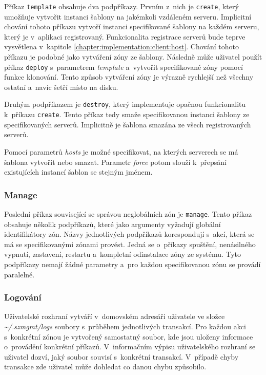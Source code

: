 Příkaz \verb|template| obsahuje dva podpříkazy. Prvním z~nich je \verb|create|, který umožňuje vytvořit instanci šablony na 
jakémkoli vzdáleném serveru. Implicitní chování tohoto příkazu vytvoří instanci specifikované šablony na každém serveru, který
je v~aplikaci registrovaný. Funkcionalita registrace serverů bude teprve vysvětlena v~kapitole \ref{chapter:implementation:client:host}.
Chování tohoto příkazu je podobné jako vytváření zóny ze šablony. Následně může uživatel použít příkaz \verb|deploy|
s~parametrem \textit{template} a~vytvořit specifikované zóny pomocí funkce klonování. Tento způsob vytváření zóny je výrazně
rychlejší než všechny ostatní a~navíc šetří místo na disku.

Druhým podpříkazem je \verb|destroy|, který implementuje opačnou funkcionalitu k~příkazu \verb|create|. Tento příkaz tedy 
smaže specifikovanou instanci šablony ze specifikovaných serverů. Implicitně je šablona smazána ze všech registrovaných serverů.

Pomocí parametrů \textit{hosts} je možné specifikovat, na kterých serverech se má šablona vytvořit nebo smazat. Parametr
\textit{force} potom slouží k~přepsání existujících instancí šablon se stejným jménem.
\subsubsection{Manage}
\label{chapter:implementation:client:cli:manage}
Poslední příkaz související se správou neglobálních zón je \verb|manage|. Tento příkaz obsahuje několik podpříkazů, které
jako argumenty vyžadují globální identifikátory zón. Názvy jednotlivých podpříkazů korespondují s~akcí, která se má se specifikovanými
zónami provést. Jedná se o~příkazy spuštění, nenásilného vypnutí, zastavení, restartu a~kompletní odinstalace zóny ze systému.
Tyto podpříkazy nemají žádné parametry a~pro každou specifikovanou zónu se provádí paralelně.
\subsubsection{Logování}
\label{chapter:implementation:client:cli:logs}
Uživatelské rozhraní vytváří v~domovském adresáři uživatele ve složce \textit{\textasciitilde/.szmgmt/logs} soubory s~průběhem
jednotlivých transakcí. Pro každou akci s~konkrétní zónou je vytvořený samostatný soubor, kde jsou uloženy informace o~provádění
konkrétní příkazů. V~informačním výpisu uživatelského rozhraní se uživatel dozví, jaký soubor souvisí s~konkrétní transakcí.
V~případě chyby transakce zde uživatel může dohledat co danou chybu způsobilo. 

